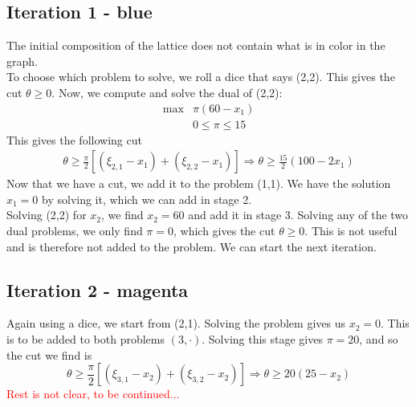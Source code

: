 \documentclass[12pt, openany]{report}
\theoremstyle{definition}
\begin{document}
\subsection{Iteration 1 - blue}
The initial composition of the lattice does not contain what is in color in the graph.\\
To choose which problem to solve, we roll a dice that says (2,2). This gives the cut $\theta\ge 0$. Now, we compute and solve the dual of (2,2):
\begin{equation}
	\begin{aligned}
		\max& \pi(60-x_1)\\
		&0\le \pi \le 15
	\end{aligned}
\end{equation}
This gives the following cut 
\begin{equation}
	\begin{aligned}
		\theta \ge \frac{\pi}{2}[(\xi_{2,1}-x_1)+(\xi_{2,2}-x_1)] \Longrightarrow \theta \ge \frac{15}{2}(100-2x_1)
	\end{aligned}
\end{equation}
Now that we have a cut, we add it to the problem (1,1). We have the solution $x_1=0$ by solving it, which we can add in stage 2. \\
Solving (2,2) for $x_2$, we find $x_2=60$ and add it in stage 3. Solving any of the two dual problems, we only find $\pi =0$, which gives the cut $\theta\ge0$. This is not useful and is therefore not added to the problem. We can start the next iteration.
\subsection{Iteration 2 - magenta}
Again using a dice, we start from (2,1). Solving the problem gives us $x_2=0$. This is to be added to both problems $(3,\cdot)$. Solving this stage gives $\pi=20$, and so the cut we find is 
\begin{equation}
	\theta \ge \frac{\pi}{2} [(\xi_{3,1}-x_2)+(\xi_{3,2}-x_2)]\Rightarrow \theta \ge 20(25-x_2)
\end{equation}
\textcolor{red}{Rest is not clear, to be continued...}
\end{document}
